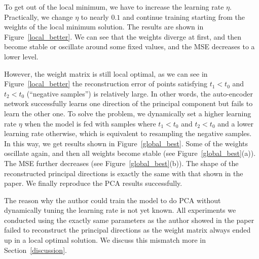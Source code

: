 To get out of the local minimum, we have to increase the learning rate $\eta$. 
Practically, we change $\eta$ to nearly $0.1$ and continue training starting from the weights of 
the local minimum solution. The results are shown in Figure~\ref{local_better}.
We can see that the weights diverge at first, and then become stable or oscillate around some fixed values,
and the MSE decreases to a lower level.

However, the weight matrix is still local optimal, 
as we can see in Figure~\ref{local_better} the reconstruction error of points
satisfying $t_1 < t_0$ and $t_2 < t_0$ (``negative samples'') is relatively large. 
In other words, the auto-encoder network successfully learns one direction of the principal component but fails
to learn the other one. To solve the problem, we dynamically set a higher learning rate $\eta$ when
the model is fed with samples where $t_1 < t_0$ and $t_2 < t_0$ and a lower learning rate otherwise,
which is equivalent to resampling the negative samples.
In this way, we get results shown in Figure~\ref{global_best}.
Some of the weights oscillate again, and then all weights become stable (see Figure~\ref{global_best}(a)).
The MSE further decreases (see Figure~\ref{global_best}(b)).
The shape of the reconstructed principal directions is exactly the same with that shown in the paper.
We finally reproduce the PCA results successfully.

The reason why the author could train the model to do PCA without dynamically tuning the learning rate is not yet known.
All experiments we conducted using the exactly same parameters as the author showed in the paper failed to reconstruct the principal directions as the weight matrix always ended up in a local optimal solution.
We discuss this mismatch more in Section~\ref{discussion}.

